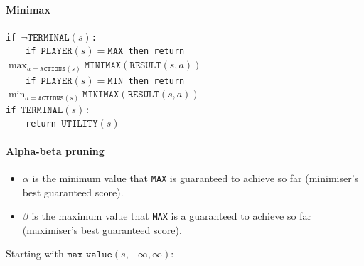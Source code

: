 \documentclass[twocolumn,english]{article}
\begin{document}
\paragraph{Minimax}

\texttt{}
\begin{table}[H]
\raggedright{}\texttt{\small{}if $\lnot\texttt{TERMINAL}\left(s\right)$:}~\\
\texttt{\small{}$\qquad$if $\texttt{PLAYER}\left(s\right)=\texttt{MAX}$
then return $\max_{a=\texttt{ACTIONS}\left(s\right)}\texttt{MINIMAX}\left(\texttt{RESULT}\left(s,a\right)\right)$}~\\
\texttt{\small{}$\qquad$if $\texttt{PLAYER}\left(s\right)=\texttt{MIN}$
then return $\min_{a=\texttt{ACTIONS}\left(s\right)}\texttt{MINIMAX}\left(\texttt{RESULT}\left(s,a\right)\right)$}~\\
\texttt{\small{}if $\texttt{TERMINAL}\left(s\right)$:}~\\
\texttt{\small{}$\qquad$return $\texttt{UTILITY}\left(s\right)$}
\end{table}

\paragraph{Alpha-beta pruning}
\begin{itemize}
\item $\alpha$ is the minimum value that \texttt{MAX} is guaranteed to
achieve so far (minimiser's best guaranteed score).
\item $\beta$ is the maximum value that \texttt{MAX} is a guaranteed to
achieve so far (maximiser's best guaranteed score).
\end{itemize}
Starting with $\texttt{max-value}\left(s,-\infty,\infty\right)$:
\end{document}
